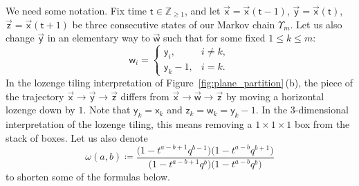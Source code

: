 \documentclass[pdftex]{sigma}
\numberwithin{equation}{section}
\begin{document}
We need some notation. Fix time $\mathsf{t}\in \mathbb{Z}_{\ge1}$,
and let
$\vec{\mathsf{x}}=\vec{\mathsf{x}}(\mathsf{t}-1)$,
$\vec{\mathsf{y}}=\vec{\mathsf{x}}(\mathsf{t})$,
$\vec{\mathsf{z}}=\vec{\mathsf{x}}(\mathsf{t}+1)$
be three consecutive states of our Markov chain $\Upsilon_m$.
Let us also change $\vec{\mathsf{y}}$ in an elementary
way to $\vec{\mathsf{w}}$ such that for some fixed $1\le k\le m$:
\begin{equation*}
	\mathsf{w}_i=\begin{cases}
		\mathsf{y}_i,&i\ne k,\\
		\mathsf{y}_k-1,& i=k.
	\end{cases}
\end{equation*}
In the lozenge tiling interpretation
of Figure~\ref{fig:plane_partition}\,(b),
the piece of the trajectory
$\vec{\mathsf{x}}\to \vec{\mathsf{y}} \to\vec{\mathsf{z}}$
differs from
$\vec{\mathsf{x}}\to \vec{\mathsf{w}} \to\vec{\mathsf{z}}$
by moving a horizontal lozenge down by $1$.
Note that
$\mathsf{y}_k=\mathsf{x}_k$ and $\mathsf{z}_k=\mathsf{w}_k=\mathsf{y}_k-1$.
In the 3-dimensional interpretation of the lozenge
tiling, this means
removing a $1\times 1\times 1$ box from the stack of boxes.
Let us also denote
\begin{equation*}
	\omega(a,b)\coloneqq
	\frac{
		\big(1-t^{a-b+1}q^{b-1}\big)
		\big(1-t^{a-b} q^{b+1}\big)
	}
	{
		\big(1-t^{a-b+1}q^{b}\big)
		\big(1-t^{a-b}q^{b}\big)
	}
\end{equation*}
to shorten some of the formulas below.
\end{document}
